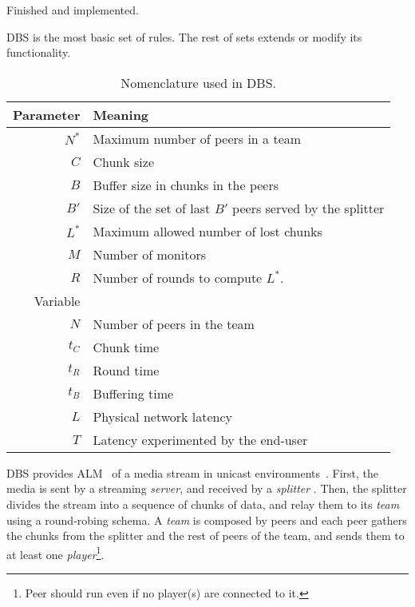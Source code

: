 

\label{sec:DBS}

\begin{notex}
  Finished and implemented.
\end{notex}

DBS is the most basic set of rules. The rest of sets extends or modify
its functionality.

\begin{table}
  \centering
  \begin{tabular}{rl}
    Parameter & Meaning \\
    \hline
    $N^*$  & Maximum number of peers in a team \\
    $C$    & Chunk size \\
    $B$    & Buffer size in chunks in the peers \\
    $B'$   & Size of the set of last $B'$ peers served by the splitter \\ 
    $L^*$  & Maximum allowed number of lost chunks \\
    $M$    & Number of monitors \\
    $R$    & Number of rounds to compute $L^*$. \\
    Variable & \\
    \hline
    $N$    & Number of peers in the team \\
    $t_C$  & Chunk time \\
    $t_R$  & Round time \\
    $t_B$  & Buffering time \\
    $L$    & Physical network latency \\
    $T$    & Latency experimented by the end-user
  \end{tabular}
  \caption{Nomenclature used in DBS.} %
  \label{tab:DBS_nomenclature}
\end{table}

\acrshort{DBS} provides ALM~\cite{banerjee2002scalable} of a media
stream in unicast environments~\cite{comer2003computer}. First, the
media is sent by a streaming \emph{server}, and received by a
\emph{splitter} . Then, the splitter
divides the stream into a sequence of chunks of data, and relay them
to its \emph{team} using a round-robing schema. A \emph{team} is
composed by peers and each peer gathers the chunks from the splitter
and the rest of peers of the team, and sends them to at least one
\emph{player}\footnote{Peer should run even if no player(s) are
  connected to it.}.

